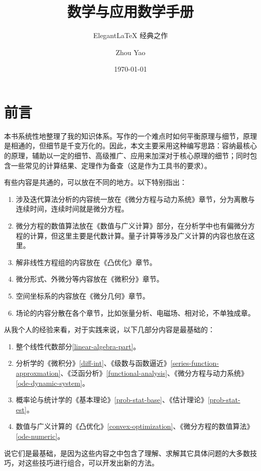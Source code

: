 \documentclass[nofontspec, cn,11pt,dvipsnames,green,cite=numbers,bibstyle=gb7714-2015,T4]{elegantbook}
\title{数学与应用数学手册}
\subtitle{Elegant\LaTeX{} 经典之作}
\author{Zhou Yao}
\date{\today}
\begin{document}
\maketitle


\mainmatter

\chapter*{前言}
本书系统性地整理了我的知识体系。写作的一个难点时如何平衡原理与细节，原理是相通的，但细节是千变万化的。因此，本文主要采用这种编写思路：容纳最核心的原理，辅助以一定的细节、高级推广、应用来加深对于核心原理的细节；同时包含一些常见的计算结果、定理作为备查（这是作为工具书的要求）。

有些内容是共通的，可以放在不同的地方。以下特别指出：
\begin{enumerate}
\item 涉及迭代算法分析的内容统一放在《微分方程与动力系统》章节，分为离散与连续时间，连续时间就是微分方程。
\item 微分方程的数值算法放在《数值与广义计算》部分，在分析学中也有偏微分方程的计算，但这里主要是代数计算。量子计算等涉及广义计算的内容也放在这里。
\item 解非线性方程组的内容放在《凸优化》章节。
\item 微分形式、外微分等内容放在《微积分》章节。
\item 空间坐标系的内容放在《微分几何》章节。
\item 场论的内容分散在各个章节，比如张量分析、电磁场、相对论，不单独成章。
\end{enumerate}

从我个人的经验来看，对于实践来说，以下几部分内容是最基础的：
\begin{enumerate}
\item 整个线性代数部分\ref{linear-algebra-part}。
\item 分析学的《微积分》\ref{diff-int}、《级数与函数逼近》\ref{series-function-approxmation}、《泛函分析》\ref{functional-analysis}、《微分方程与动力系统》\ref{ode-dynamic-system}。
\item 概率论与统计学的《基本理论》\ref{prob-stat-base}、《估计理论》\ref{prob-stat-est}。
\item 数值与广义计算的《凸优化》\ref{convex-optimization}、《微分方程的数值算法》\ref{ode-numeric}。
\end{enumerate}
说它们是最基础，是因为这些内容之中包含了理解、求解其它具体问题的大多数技巧，对这些技巧进行组合，可以开发出新的方法。
\end{document}
